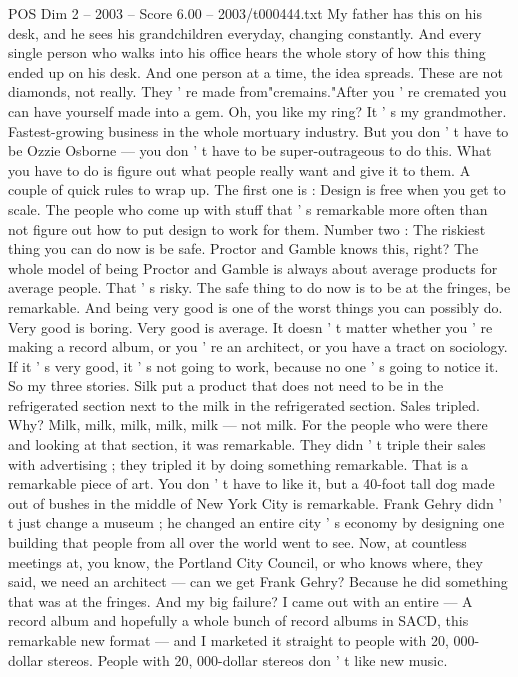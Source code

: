 \begin{textsample}{POS Dim 2 – 2003 – Score 6.00 – 2003/t000444.txt}
My father has this on his desk, and he sees his grandchildren everyday, changing constantly.
And every single person who walks into his office hears the whole story of how this thing ended up on his desk.
And one person at a time, the idea spreads.
These are not diamonds, not really.
They ' re made from"cremains."After you ' re cremated you can have yourself made into a gem.
Oh, you like my ring?
It ' s my grandmother.
Fastest-growing business in the whole mortuary industry.
But you don ' t have to be Ozzie Osborne — you don ' t have to be super-outrageous to do this.
What you have to do is figure out what people really want and give it to them.
A couple of quick rules to wrap up.
The first one is : Design is free when you get to scale.
The people who come up with stuff that ' s remarkable more often than not figure out how to put design to work for them.
Number two : The riskiest thing you can do now is be safe.
Proctor and Gamble knows this, right?
The whole model of being Proctor and Gamble is always about average products for average people.
That ' s risky.
The safe thing to do now is to be at the fringes, be remarkable.
And being very good is one of the worst things you can possibly do.
Very good is boring.
Very good is average.
It doesn ' t matter whether you ' re making a record album, or you ' re an architect, or you have a tract on sociology.
If it ' s very good, it ' s not going to work, because no one ' s going to notice it.
So my three stories.
Silk put a product that does not need to be in the refrigerated section next to the milk in the refrigerated section.
Sales tripled.
Why?
Milk, milk, milk, milk, milk — not milk.
For the people who were there and looking at that section, it was remarkable.
They didn ' t triple their sales with advertising ; they tripled it by doing something remarkable.
That is a remarkable piece of art.
You don ' t have to like it, but a 40-foot tall dog made out of bushes in the middle of New York City is remarkable.
Frank Gehry didn ' t just change a museum ; he changed an entire city ' s economy by designing one building that people from all over the world went to see.
Now, at countless meetings at, you know, the Portland City Council, or who knows where, they said, we need an architect — can we get Frank Gehry?
Because he did something that was at the fringes.
And my big failure?
I came out with an entire — A record album and hopefully a whole bunch of record albums in SACD, this remarkable new format — and I marketed it straight to people with 20, 000- dollar stereos.
People with 20, 000-dollar stereos don ' t like new music.

\end{textsample}
